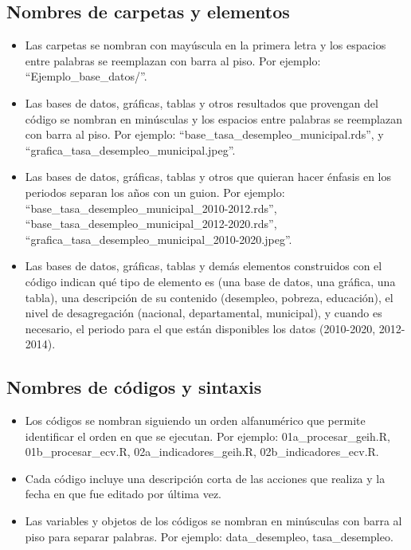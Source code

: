 \subsection{Nombres de carpetas y elementos}
\begin{itemize}
    \item Las carpetas se nombran con mayúscula en la primera letra y los espacios entre palabras se reemplazan con barra al piso. Por ejemplo: “Ejemplo\_base\_datos/”.
    \item Las bases de datos, gráficas, tablas y otros resultados que provengan del código se nombran en minúsculas y los espacios entre palabras se reemplazan con barra al piso. Por ejemplo: “base\_tasa\_desempleo\_municipal.rds”, y “grafica\_tasa\_desempleo\_municipal.jpeg”.
    \item Las bases de datos, gráficas, tablas y otros que quieran hacer énfasis en los periodos separan los años con un guion. Por ejemplo: “base\_tasa\_desempleo\_municipal\_2010-2012.rds”, “base\_tasa\_desempleo\_municipal\_2012-2020.rds”, “grafica\_tasa\_desempleo\_municipal\_2010-2020.jpeg”.
    \item Las bases de datos, gráficas, tablas y demás elementos construidos con el código indican qué tipo de elemento es (una base de datos, una gráfica, una tabla), una descripción de su contenido (desempleo, pobreza, educación), el nivel de desagregación (nacional, departamental, municipal), y cuando es necesario, el periodo para el que están disponibles los datos (2010-2020, 2012-2014).
\end{itemize}


\subsection{Nombres de códigos y sintaxis}

\begin{itemize}
    \item Los códigos se nombran siguiendo un orden alfanumérico que permite identificar el orden en que se ejecutan. Por ejemplo: 01a\_procesar\_geih.R, 01b\_procesar\_ecv.R, 02a\_indicadores\_geih.R, 02b\_indicadores\_ecv.R.
    \item Cada código incluye una descripción corta de las acciones que realiza y la fecha en que fue editado por última vez.
    \item Las variables y objetos de los códigos se nombran en minúsculas con barra al piso para separar palabras. Por ejemplo: data\_desempleo, tasa\_desempleo.
\end{itemize}




